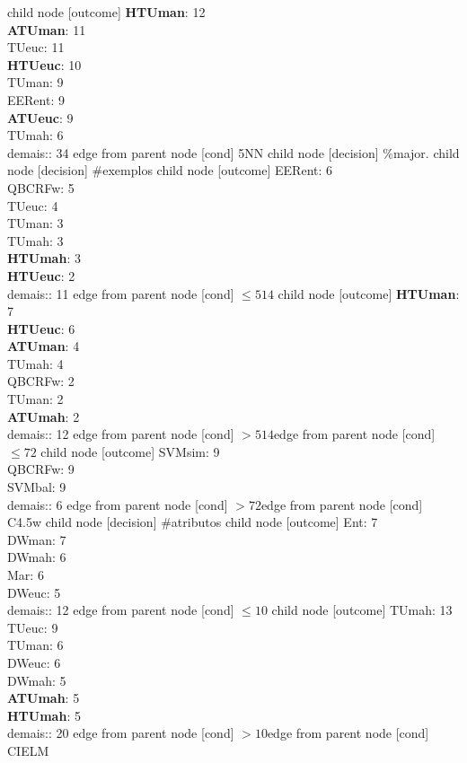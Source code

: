 child {node [outcome] {\textbf{HTUman}: 12\\
\textbf{ATUman}: 11\\
TUeuc: 11\\
\textbf{HTUeuc}: 10\\
TUman: 9\\
EERent: 9\\
\textbf{ATUeuc}: 9\\
TUmah: 6\\
demais:: 34} edge from parent node [cond] {5NN}}
child {node [decision] {\%major.}
child {node [decision] {\#exemplos}
child {node [outcome] {EERent: 6\\
QBCRFw: 5\\
TUeuc: 4\\
TUman: 3\\
TUmah: 3\\
\textbf{HTUmah}: 3\\
\textbf{HTUeuc}: 2\\
demais:: 11} edge from parent node [cond] {$\leq514$}}
child {node [outcome] {\textbf{HTUman}: 7\\
\textbf{HTUeuc}: 6\\
\textbf{ATUman}: 4\\
TUmah: 4\\
QBCRFw: 2\\
TUman: 2\\
\textbf{ATUmah}: 2\\
demais:: 12} edge from parent node [cond] {$>514$}}edge from parent node [cond] {$\leq72$}}
child {node [outcome] {SVMsim: 9\\
QBCRFw: 9\\
SVMbal: 9\\
demais:: 6} edge from parent node [cond] {$>72$}}edge from parent node [cond] {C4.5w}}
child {node [decision] {\#atributos}
child {node [outcome] {Ent: 7\\
DWman: 7\\
DWmah: 6\\
Mar: 6\\
DWeuc: 5\\
demais:: 12} edge from parent node [cond] {$\leq10$}}
child {node [outcome] {TUmah: 13\\
TUeuc: 9\\
TUman: 6\\
DWeuc: 6\\
DWmah: 5\\
\textbf{ATUmah}: 5\\
\textbf{HTUmah}: 5\\
demais:: 20} edge from parent node [cond] {$>10$}}edge from parent node [cond] {CIELM}}
